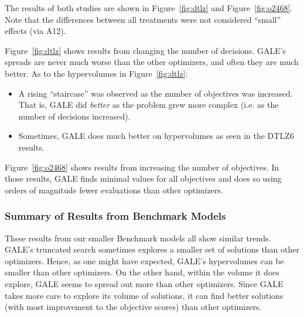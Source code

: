 \documentclass[10pt,journal,compsoc]{IEEEtran}
\newcommand{\bi}{\begin{itemize}}
\newcommand{\ei}{\end{itemize}}
\newcommand{\fig}[1]{Figure~\ref{fig:#1}}
\begin{document}
The results of both studies are shown in \fig{dtlz}
and \fig{o2468}. Note that the differences
between all treatments were not considered ``small'' effects (via A12).

\fig{dtlz} shows results from changing the number of decisions.
GALE's spreads are never much worse than the other
optimizers, and often they are much
better. 
As to the hypervolumes in  \fig{dtlz}:
\bi
\item
A rising ``staircase'' was observed as the number of
objectives was increased. That is,  GALE did {\em better}
as the problem grew more complex (i.e. as the number of decisions increased).
\item
Sometimes, GALE does much better on hypervolumes as
seen in the DTLZ6 results.
\ei
\fig{o2468} shows results from increasing the
number of objectives. 
In those results,   GALE 
finds minimal values for all objectives and does
so using  orders of magnitude fewer evaluations than
 other optimizers.




\subsubsection{Summary of Results from Benchmark Models}

These results from our smaller Benchmark models all show similar trends.
GALE's truncated search sometimes explores a
smaller set of solutions than other
optimizers.  Hence, as one might have expected, GALE's hypervolumes can be smaller than other optimizers. On the other hand,
within the volume it does explore, GALE seems to spread
out more than other optimizers.
Since GALE takes more care to explore its volume of solutions,
it can find better solutions (with most improvement to the objective scores)
than other optimizers.
 

\end{document}
